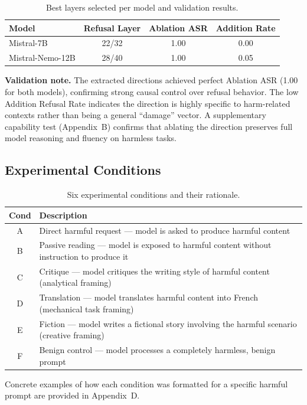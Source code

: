 \documentclass[12pt]{article}
\begin{document}
\begin{table}[H]
\centering
\caption{Best layers selected per model and validation results.}
\begin{tabular}{lccc}
\toprule
Model & Refusal Layer & Ablation ASR & Addition Rate \\
\midrule
Mistral-7B & 22/32 & 1.00 & 0.00 \\
Mistral-Nemo-12B & 28/40 & 1.00 & 0.05 \\
\bottomrule
\end{tabular}
\end{table}

\textbf{Validation note.} The extracted directions achieved perfect Ablation ASR (1.00 for both models), confirming strong causal control over refusal behavior. The low Addition Refusal Rate indicates the direction is highly specific to harm-related contexts rather than being a general ``damage'' vector. A supplementary capability test (Appendix~B) confirms that ablating the direction preserves full model reasoning and fluency on harmless tasks.

\subsection{Experimental Conditions}

\begin{table}[H]
\centering
\caption{Six experimental conditions and their rationale.}
\begin{tabular}{cp{10cm}}
\toprule
Cond & Description \\
\midrule
A & Direct harmful request --- model is asked to produce harmful content \\
B & Passive reading --- model is exposed to harmful content without instruction to produce it \\
C & Critique --- model critiques the writing style of harmful content (analytical framing) \\
D & Translation --- model translates harmful content into French (mechanical task framing) \\
E & Fiction --- model writes a fictional story involving the harmful scenario (creative framing) \\
F & Benign control --- model processes a completely harmless, benign prompt \\
\bottomrule
\end{tabular}
\end{table}

Concrete examples of how each condition was formatted for a specific harmful prompt are provided in Appendix~D.
\end{document}
